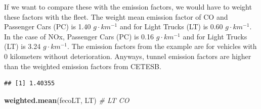 \documentclass[12pt,graybox,envcountchap,sectrefs]{krantz}
\makeatletter
\newenvironment{Shaded}{\begin{snugshade}}{\end{snugshade}}
\newcommand{\KeywordTok}[1]{\textcolor[rgb]{0.13,0.29,0.53}{\textbf{#1}}}
\newcommand{\DataTypeTok}[1]{\textcolor[rgb]{0.13,0.29,0.53}{#1}}
\newcommand{\DecValTok}[1]{\textcolor[rgb]{0.00,0.00,0.81}{#1}}
\newcommand{\StringTok}[1]{\textcolor[rgb]{0.31,0.60,0.02}{#1}}
\newcommand{\CommentTok}[1]{\textcolor[rgb]{0.56,0.35,0.01}{\textit{#1}}}
\newcommand{\OtherTok}[1]{\textcolor[rgb]{0.56,0.35,0.01}{#1}}
\newcommand{\OperatorTok}[1]{\textcolor[rgb]{0.81,0.36,0.00}{\textbf{#1}}}
\newcommand{\NormalTok}[1]{#1}
\newenvironment{kframe}{%
\medskip{}
\setlength{\fboxsep}{.8em}
 \def\at@end@of@kframe{}%
 \ifinner\ifhmode%
  \def\at@end@of@kframe{\end{minipage}}%
  \begin{minipage}{\columnwidth}%
 \fi\fi%
 \def\FrameCommand##1{\hskip\@totalleftmargin \hskip-\fboxsep
 \colorbox{shadecolor}{##1}\hskip-\fboxsep
     \hskip-\linewidth \hskip-\@totalleftmargin \hskip\columnwidth}%
 \MakeFramed {\advance\hsize-\width
   \@totalleftmargin\z@ \linewidth\hsize
   \@setminipage}}%
 {\par\unskip\endMakeFramed%
 \at@end@of@kframe}
\renewenvironment{Shaded}{\begin{kframe}}{\end{kframe}}
\theoremstyle{definition}
\theoremstyle{definition}
\theoremstyle{definition}
\theoremstyle{remark}
\makeatother
\begin{document}
If we want to compare these with the \citet{CETESB2015} emission
factors, we would have to weight these factors with the fleet. The
weight mean emission factor of CO and Passenger Cars (PC) is 1.40
\(g \cdot km^{-1}\) and for Light Trucks (LT) is 0.60
\(g \cdot km^{-1}\). In the case of NOx, Passenger Cars (PC) is 0.16
\(g \cdot km^{-1}\) and for Light Trucks (LT) is 3.24
\(g \cdot km^{-1}\). The emission factors from the example are for
vehicles with 0 kilometers without deterioration. Anyways, tunnel
emission factors are higher than the weighted emission factors from
CETESB.

\begin{Shaded}
\end{Shaded}

\begin{verbatim}
## [1] 1.40355
\end{verbatim}

\begin{Shaded}
\begin{Highlighting}[]
\KeywordTok{weighted.mean}\NormalTok{(fecoLT, LT)  }\CommentTok{# LT CO}
\end{Highlighting}
\end{Shaded}
\end{document}
